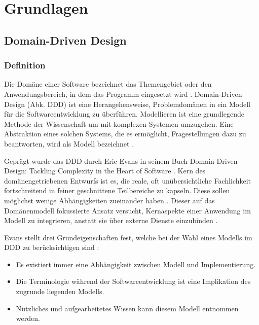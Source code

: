 \chapter{Grundlagen}

%
%

\section{Domain-Driven Design}

\subsection{Definition}

Die Domäne einer Software bezeichnet das Themengebiet oder den Anwendungsbereich, in dem das Programm eingesetzt wird \cite[S.2]{evans} \cite[S.307]{posch}. \glqq Domain-Driven Design\grqq{} (Abk. DDD) ist eine Herangehensweise, Problemdomänen in ein Modell für die Softwareentwicklung zu überführen. Modellieren ist eine grundlegende Methode der Wissenschaft um mit komplexen Systemen umzugehen. Eine Abstraktion eines solchen Systems, die es ermöglicht, Fragestellungen dazu zu beantworten, wird als Modell bezeichnet \cite{brugge}.

Geprägt wurde das DDD durch Eric Evans in seinem Buch \glqq Domain-Driven Design: Tackling Complexity in the Heart of Software\grqq{} \cite{evans}. Kern des domänengetriebenen Entwurfs ist es, die reale, oft unübersichtliche Fachlichkeit fortschreitend in feiner geschnittene Teilbereiche zu kapseln. Diese sollen möglichst wenige Abhängigkeiten zueinander haben \cite[S.63, 70]{dowalil}. Dieser auf das Domänenmodell fokussierte Ansatz versucht, Kernaspekte einer Anwendung im Modell zu integrieren, anstatt sie über externe Dienste einzubinden \cite[S.74]{daschner}.

Evans stellt drei Grundeigenschaften fest, welche bei der Wahl eines Modells im DDD zu berücksichtigen sind \cite[S. 3-4]{evans}:
\begin{itemize}
\item Es existiert immer eine Abhängigkeit zwischen Modell und Implementierung.
\item Die Terminologie während der Softwareentwicklung ist eine Implikation des zugrunde liegenden Modells.
\item Nützliches und aufgearbeitetes Wissen kann diesem Modell entnommen werden.
\end{itemize}

